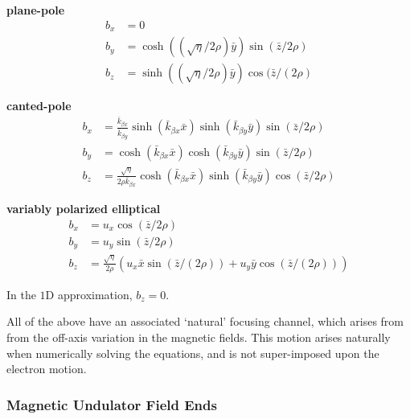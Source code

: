 \documentclass[12pt]{article}%
\begin{document}
{\bf plane-pole}
\begin{align}
b_x  & = 0 \\
b_y & =  \cosh((\sqrt{\eta}/{2\rho}) \bar{y}) \sin({\bar{z}/2\rho}) \\
b_z & =   \sinh((\sqrt{\eta}/{2\rho}) \bar{y}) \cos({\bar{z} / (2 \rho)}
\end{align}




{\bf canted-pole}
\begin{align}
b_x  & =  \frac{\bar{k}_{\beta x}}{\bar{k}_{\beta y}}  \sinh(\bar{k}_{\beta x} \bar{x} )  \sinh(   \bar{k}_{\beta y} \bar{y}    )   \sin({\bar{z}/2\rho}) \label{cp1} \\
b_y & =   \cosh(\bar{k}_{\beta x} \bar{x} )  \cosh(   \bar{k}_{\beta y} \bar{y}    )   \sin({\bar{z}/2\rho}) \label{cp2}\\
b_z & = \frac{\sqrt{\eta}}{2\rho \bar{k}_{\beta x}}     \cosh(\bar{k}_{\beta x} \bar{x} )    \sinh(   \bar{k}_{\beta y} \bar{y}    )    \cos({\bar{z}/2\rho}) \label{cp3}
\end{align}


{\bf variably polarized elliptical}
\begin{align}
b_x  & = u_x \cos({\bar{z}/2\rho}) \\
b_y & =  u_y \sin({\bar{z}/2\rho}) \\
b_z & = \frac{\sqrt{\eta}}{2\rho} (u_x \bar{x}\sin({\bar{z} / (2 \rho)}) + u_y \bar{y}\cos({\bar{z} / (2 \rho)}))
\end{align}


In the $1$D approximation, $b_z = 0$.

All of the above have an associated `natural' focusing channel, which arises from from the off-axis variation in the magnetic fields. This motion arises naturally when numerically solving the equations, and is not super-imposed upon the electron motion.

\subsubsection{Magnetic Undulator Field Ends}
\end{document}
